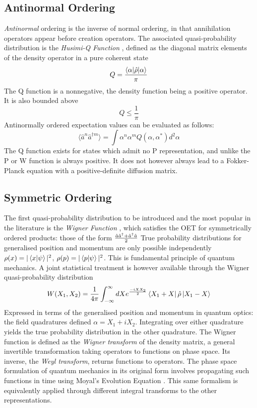 \subsection{Antinormal Ordering}
\emph{Antinormal} ordering is the inverse of normal ordering, in that annihilation operators appear before creation operators.
The associated quasi-probability distribution is the \emph{Husimi-Q Function} \cite{Husimi1940}, defined as the diagonal matrix elements of the density operator in a pure coherent state
\begin{equation}
	Q = \frac{\langle \alpha | \hat{\rho} | \alpha \rangle}{\pi}
	\label{qdef}
\end{equation}
The Q function is a nonnegative, the density function being a positive operator.
It is also bounded above
\begin{equation}
	Q \leq \frac{1}{\pi}
\end{equation}
Antinormally ordered expectation values can be evaluated as follows:
\begin{equation}
	\langle \hat{a}^n \hat{a}^{\dagger m}  \rangle = \int \alpha^n \alpha^m Q (\alpha, \alpha^*) d^2 \alpha
\end{equation}
The Q function exists for states which admit no P representation, and unlike the P or W function is always positive.
It does not however always lead to a Fokker-Planck equation with a positive-definite diffusion matrix. 
\subsection{Symmetric Ordering}
The first quasi-probability distribution to be introduced and the most popular in the literature is the \emph{Wigner Function} \cite{Wigner1932} , which satisfies the OET for symmetrically ordered products: those of the form $\frac{\hat{a} \hat{a}^\dagger + \hat{a}^\dagger \hat{a}}{2}$
True probability distributions for generalised position and momentum are only possible independently $\rho(x) = |\braket{x}{\psi}|^2$, $\rho(p) = |\braket{p}{\psi}|^2$.
This is fundamental principle of quantum mechanics.
A joint statistical treatment is however available through the Wigner quasi-probability distribution
\begin{equation}
	W(X_1, X_2) = \frac{1}{4 \pi} \int_{-\infty}^\infty dX e^{\frac{-iXX_2}{2}} \bra{X_1+X} \hat{\rho} \ket{X_1-X}
\end{equation}
Expressed in terms of the generalised position and momentum in quantum optics: the field quadratures defined $\alpha = X_1 + iX_2$.
Integrating over either quadrature yields the true probability distribution in the other quadrature.
The Wigner function is defined as the \emph{Wigner transform} of the density matrix, a general invertible transformation taking operators to functions on phase space.
Its inverse, the \emph{Weyl transform}, returns functions to operators.
The phase space formulation of quantum mechanics in its original form involves propagating such functions in time using Moyal's Evolution Equation \cite{Curtright2011}.
This same formalism is equivalently applied  through different integral transforms to the other representations.
